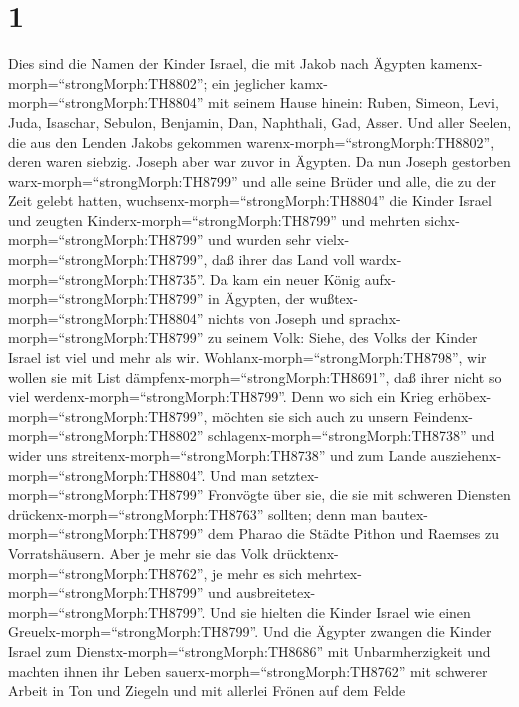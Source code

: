 \hypertarget{section}{%
\section{1}\label{section}}

 Dies sind die Namen der Kinder Israel, die mit Jakob nach
Ägypten kamenx-morph=``strongMorph:TH8802''; ein jeglicher
kamx-morph=``strongMorph:TH8804'' mit seinem Hause hinein: 
Ruben, Simeon, Levi, Juda,  Isaschar, Sebulon, Benjamin,
 Dan, Naphthali, Gad, Asser.  Und aller Seelen,
die aus den Lenden Jakobs gekommen warenx-morph=``strongMorph:TH8802'',
deren waren siebzig. Joseph aber war zuvor in Ägypten.  Da
nun Joseph gestorben warx-morph=``strongMorph:TH8799'' und alle seine
Brüder und alle, die zu der Zeit gelebt hatten, 
wuchsenx-morph=``strongMorph:TH8804'' die Kinder Israel und zeugten
Kinderx-morph=``strongMorph:TH8799'' und mehrten
sichx-morph=``strongMorph:TH8799'' und wurden sehr
vielx-morph=``strongMorph:TH8799'', daß ihrer das Land voll
wardx-morph=``strongMorph:TH8735''.  Da kam ein neuer König
aufx-morph=``strongMorph:TH8799'' in Ägypten, der
wußtex-morph=``strongMorph:TH8804'' nichts von Joseph  und
sprachx-morph=``strongMorph:TH8799'' zu seinem Volk: Siehe, des Volks
der Kinder Israel ist viel und mehr als wir. 
Wohlanx-morph=``strongMorph:TH8798'', wir wollen sie mit List
dämpfenx-morph=``strongMorph:TH8691'', daß ihrer nicht so viel
werdenx-morph=``strongMorph:TH8799''. Denn wo sich ein Krieg
erhöbex-morph=``strongMorph:TH8799'', möchten sie sich auch zu unsern
Feindenx-morph=``strongMorph:TH8802''
schlagenx-morph=``strongMorph:TH8738'' und wider uns
streitenx-morph=``strongMorph:TH8738'' und zum Lande
ausziehenx-morph=``strongMorph:TH8804''.  Und man
setztex-morph=``strongMorph:TH8799'' Fronvögte über sie, die sie mit
schweren Diensten drückenx-morph=``strongMorph:TH8763'' sollten; denn
man bautex-morph=``strongMorph:TH8799'' dem Pharao die Städte Pithon und
Raemses zu Vorratshäusern.  Aber je mehr sie das Volk
drücktenx-morph=``strongMorph:TH8762'', je mehr es sich
mehrtex-morph=``strongMorph:TH8799'' und
ausbreitetex-morph=``strongMorph:TH8799''. Und sie hielten die Kinder
Israel wie einen Greuelx-morph=``strongMorph:TH8799''.  Und
die Ägypter zwangen die Kinder Israel zum
Dienstx-morph=``strongMorph:TH8686'' mit Unbarmherzigkeit 
und machten ihnen ihr Leben sauerx-morph=``strongMorph:TH8762'' mit
schwerer Arbeit in Ton und Ziegeln und mit allerlei Frönen auf dem Felde
